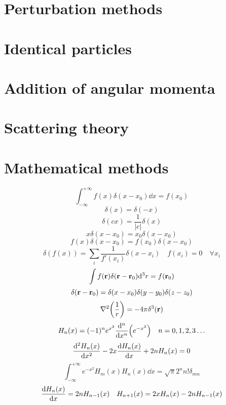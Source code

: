 \documentclass[12pt]{article}
\begin{document}
\section*{Perturbation methods}
\section*{Identical particles}
\section*{Addition of angular momenta}
\section*{Scattering theory}
\section*{Mathematical methods}
\[\int_{-\infty}^{+\infty}f(x)\delta(x-x_0)\dd{x}=f(x_0)\]
\[\delta(x)=\delta(-x)\]
\[\delta(cx)=\frac{1}{|c|}\delta(x)\]
\[x\delta(x-x_0)=x_0\delta(x-x_0)\]
\[f(x)\delta(x-x_0)=f(x_0)\delta(x-x_0)\]
\[\delta(f(x))=\sum_{i}\frac{1}{f'(x_i)}\delta(x-x_i)\quad f(x_i)=0\quad\forall{x_i}\]
\[\int f(\vb{r})\delta(\vb{r}-\vb{r}_0)\dd^3{r}=f(\vb{r}_0)\]
\[\delta(\vb{r}-\vb{r}_0)=\delta(x-x_0)\delta(y-y_0)\delta(z-z_0)\]
\[\laplacian(\frac{1}{r})=-4\pi\delta^3(\vb{r})\]
\[H_n(x)=(-1)^ne^{x^2}\dv[n]{x}\qty(e^{-x^2})\quad n=0,1,2,3\ldots\]
\[\dv[2]{H_n(x)}{x}-2x\dv{H_n(x)}{x}+2nH_n(x)=0\]
\[\int_{-\infty}^{+\infty}e^{-x^2}H_m(x)H_n(x)\dd{x}=\sqrt{\pi}2^nn!\delta_{mn}\]
\[\dv{H_n(x)}{x}=2nH_{n-1}(x)\quad H_{n+1}(x)=2xH_n(x)-2nH_{n-1}(x)\]
\end{document}
